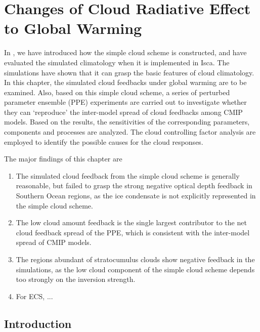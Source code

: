 \chapter{Changes of Cloud Radiative Effect to Global Warming}
\label{ch:cld_fbk}

In , we have introduced how the simple cloud scheme is constructed, and have evaluated the simulated climatology when it is implemented in Isca. The simulations have shown that it can grasp the basic features of cloud climatology. In this chapter, the simulated cloud feedbacks under global warming are to be examined. Also, based on this simple cloud scheme, a series of perturbed parameter ensemble (PPE) experiments are carried out to investigate whether they can `reproduce' the inter-model spread of cloud feedbacks among CMIP models. Based on the results, the sensitivities of the corresponding parameters, components and processes are analyzed. The cloud controlling factor analysis are employed to identify the possible causes for the cloud responses.

The major findings of this chapter are

\begin{enumerate}
    \item The simulated cloud feedback from the simple cloud scheme is generally reasonable, but failed to grasp the strong negative optical depth feedback in Southern Ocean regions, as the ice condensate is not explicitly represented in the simple cloud scheme.
    \item The low cloud amount feedback is the single largest contributor to the net cloud feedback spread of the PPE, which is consistent with the inter-model spread of CMIP models.
    \item The regions abundant of stratocumulus clouds show negative feedback in the simulations, as the low cloud component of the simple cloud scheme depends too strongly on the inversion strength.
    \item For ECS, ...
\end{enumerate}

\section{Introduction}

